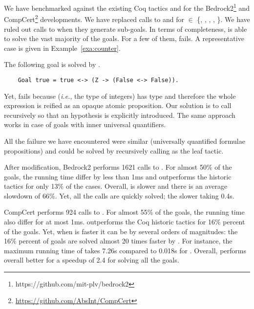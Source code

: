 \documentclass[a4paper,UKenglish,cleveref, autoref, thm-restate]{lipics-v2019}
\begin{document}
We have benchmarked  against the existing Coq tactics
 and  for the
Bedrock2\footnote{https://github.com/mit-plv/bedrock2} and
CompCert\footnote{\url{https://github.com/AbsInt/CompCert}}
developments.
%
We have replaced calls to  and  for
 $\in$ \{, , , ,  \}.
%
We have ruled out calls to  when they generate sub-goals.
%
In  terms of  completeness,   is able  to solve  the vast
majority  of the  goals. For  a few  of them,   fails.  A
representative case is given in Example~\ref{exa:counter}.
\begin{example} The following goal is solved by .
  \label{exa:counter}
  \begin{verbatim}
    Goal true = true <-> (Z -> (False <-> False)).
  \end{verbatim}
  Yet,  fails because  (\emph{i.e.},
  the type of integers) has type  and therefore the whole
  expression  is reified as an opaque
  atomic proposition. Our solution is to call 
  recursively so that an hypothesis  is explicitly
  introduced. The same approach works in case of goals with inner
  universal quantifiers.
\end{example}
All the failure we have encountered were similar (universally
quantified formulae propositions) and could be solved by recursively calling
 as the leaf tactic.

After modification, Bedrock2 performs 1621 calls to . For
almost 50\% of the goals, the running time differ by less than 1ms and
 outperforms the historic tactics for only 13\% of the
cases. Overall,  is slower and there is an average slowdown of 66\%.
Yet, all the calls are quickly solved; the slower taking 0.4s.

CompCert performs 924 calls to .  For almost 55\% of the
goals, the running time also differ for at most 1ms. 
outperforms the Coq historic tactics for 16\% percent of the
goals. Yet, when  is faster it can be by several orders
of magnitudes: the 16\% percent of goals are solved almost 20 times
faster by .
%
For instance, the maximum running time of  takes 7.26s
compared to 0.018s for . Overall,  performs
overall better for a speedup of 2.4 for solving all the goals.
\end{document}

